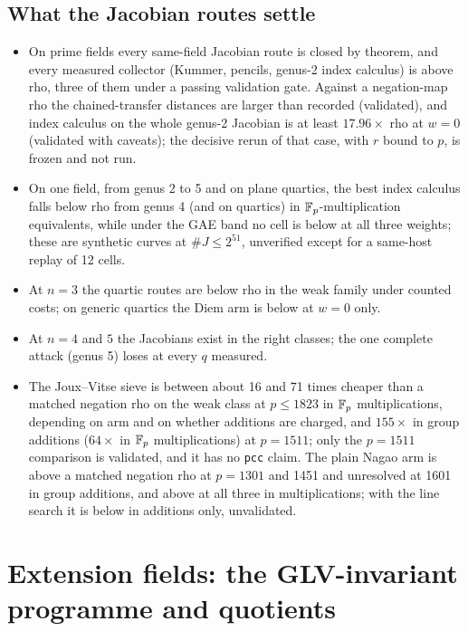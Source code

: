 \section{What the Jacobian routes settle}\label{sec:jac-summary}

\begin{itemize}
\item On prime fields every same-field Jacobian route is closed by
  theorem, and every measured collector (Kummer, pencils, genus-2 index
  calculus) is above rho, three of them under a passing validation gate.
  Against a negation-map rho the chained-transfer distances are larger than
  recorded (validated), and index calculus on the whole genus-2 Jacobian is
  at least $17.96\times$ rho at $w=0$ (validated with caveats); the decisive
  rerun of that case, with $r$ bound to $p$, is frozen and not run.
\item On one field, from genus 2 to 5 and on plane quartics, the best index
  calculus falls below rho from genus 4 (and on quartics) in
  $\mathbb{F}_p$-multiplication equivalents, while under the GAE band no cell is
  below at all three weights; these are synthetic curves at $\#J\le2^{51}$,
  unverified except for a same-host replay of 12 cells.
\item At $n=3$ the quartic routes are below rho in the weak family under
  counted costs; on generic quartics the Diem arm is below at $w=0$ only.
\item At $n=4$ and $5$ the Jacobians exist in the right classes; the one
  complete attack (genus 5) loses at every $q$ measured.
\item The Joux--Vitse sieve is between about 16 and 71 times cheaper than a
  matched negation rho on the weak class at $p\le1823$ in $\mathbb{F}_p$
  multiplications, depending on arm and on whether additions are charged,
  and $155\times$ in group additions ($64\times$ in $\mathbb{F}_p$ multiplications)
  at $p=1511$; only the $p=1511$ comparison is validated, and it has no
  \texttt{pcc} claim. The plain Nagao arm is above a matched negation rho at
  $p=1301$ and 1451 and unresolved at 1601 in group additions, and above at
  all three in multiplications; with the line search it is below in
  additions only, unvalidated.
\end{itemize}
\chapter{Extension fields: the GLV-invariant programme and quotients}\label{ch:glvprogramme}

